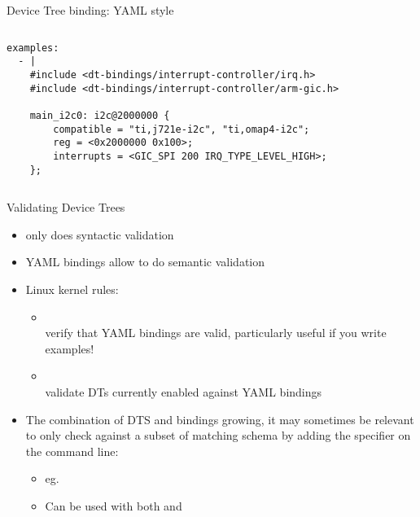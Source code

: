 \begin{frame}[fragile]{Device Tree binding: YAML style}
\begin{columns}[t]
\begin{block}{}
{\begin{verbatim}
examples:
  - |
    #include <dt-bindings/interrupt-controller/irq.h>
    #include <dt-bindings/interrupt-controller/arm-gic.h>

    main_i2c0: i2c@2000000 {
        compatible = "ti,j721e-i2c", "ti,omap4-i2c";
        reg = <0x2000000 0x100>;
        interrupts = <GIC_SPI 200 IRQ_TYPE_LEVEL_HIGH>;
    };
\end{verbatim}
      }
    \end{block}
  \end{columns}
\end{frame}

\begin{frame}{Validating Device Trees}
  \begin{itemize}
  \item {} only does syntactic validation
  \item YAML bindings allow to do semantic validation
  \item Linux kernel  rules:
    \begin{itemize}
    \item {}\\
      verify that YAML bindings are valid, particularly useful if you
      write examples!
    \item {}\\
      validate DTs currently enabled against YAML bindings
    \end{itemize}
  \item The combination of DTS and bindings growing, it may sometimes be
    relevant to only check against a subset of matching schema by adding
    the  specifier on the  command line:
    \begin{itemize}
    \item eg. \\
    \item Can be used with both  and 
    \end{itemize}
  \end{itemize}
\end{frame}

